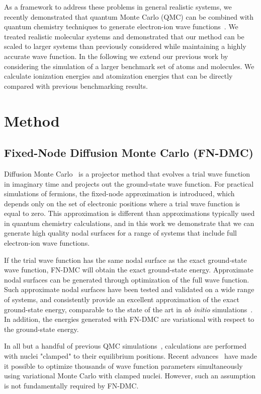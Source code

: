 \documentclass[pra,superscriptaddress,groupedaddress,twocolumn]{revtex4}
\begin{document}
As a framework to address these problems in general realistic systems, we recently demonstrated that quantum Monte Carlo (QMC) can be combined with quantum chemistry techniques to generate electron-ion wave functions~\cite{Tubman_ECG}. We treated realistic molecular systems and demonstrated that our method can be scaled to larger systems than previously considered while maintaining a highly accurate wave function. In the following we extend our previous work by considering the simulation of a larger benchmark set of atoms and molecules.  We calculate ionization energies and atomization energies that can be directly compared with previous benchmarking results.

\section{Method}
\subsection{Fixed-Node Diffusion Monte Carlo (FN-DMC)}
Diffusion Monte Carlo~\cite{Anderson_DMC,lester1,Stuart_Review,Needs_Review,Needs_Old_Review,QMC_Review} is a projector method that evolves a trial wave function in imaginary time and projects out the ground-state wave function. For practical simulations of fermions, the fixed-node approximation is introduced, which depends only on the set of electronic positions where a trial wave function is equal to zero.  This approximation is different than approximations typically used in quantum chemistry calculations, and in this work we demonstrate that we can generate high quality nodal surfaces for a range of systems that include full electron-ion wave functions. 

If the trial wave function has the same nodal surface as the exact ground-state wave function, FN-DMC will obtain the exact ground-state energy.  Approximate nodal surfaces can be generated through optimization of the full wave function. Such approximate nodal surfaces have been tested and validated on a wide range of systems, and consistently provide an excellent approximation of the exact ground-state energy,  comparable to the state of the art in \textit{ab initio} simulations~\cite{grossman1}. In addition, the energies generated with FN-DMC are variational with respect to the ground-state energy.

In all but a handful of previous QMC simulations~\cite{Ceperley_1987,Natoli_1993,Natoli_1995,Chen_1995,Coldwell_H2_2008,Gabriele_H2_2004,Sandro_finiteT-noBO_2012}, calculations are performed with nuclei "clamped" to their equilibrium positions. Recent advances~\cite{Nightingale_Linear,Umrigar_Linear,Brown_Bench} have made it possible to optimize thousands of wave function parameters simultaneously using variational Monte Carlo with clamped nuclei. However, such an assumption is not fundamentally required by FN-DMC. %
\end{document}
